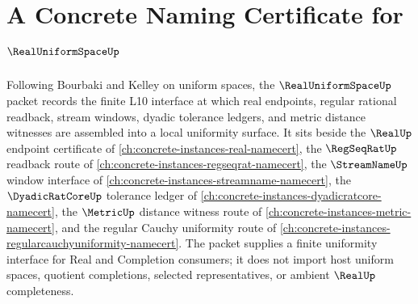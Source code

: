 \chapter{A Concrete Naming Certificate for $\RealUniformSpaceUp$}
\label{ch:concrete-instances-real-uniform-space-namecert}

Following Bourbaki and Kelley on uniform spaces, the $\RealUniformSpaceUp$ packet records the finite L10 interface at which real endpoints, regular rational readback, stream windows, dyadic tolerance ledgers, and metric distance witnesses are assembled into a local uniformity surface. It sits beside the $\RealUp$ endpoint certificate of \autoref{ch:concrete-instances-real-namecert}, the $\RegSeqRatUp$ readback route of \autoref{ch:concrete-instances-regseqrat-namecert}, the $\StreamNameUp$ window interface of \autoref{ch:concrete-instances-streamname-namecert}, the $\DyadicRatCoreUp$ tolerance ledger of \autoref{ch:concrete-instances-dyadicratcore-namecert}, the $\MetricUp$ distance witness route of \autoref{ch:concrete-instances-metric-namecert}, and the regular Cauchy uniformity route of \autoref{ch:concrete-instances-regularcauchyuniformity-namecert}. The packet supplies a finite uniformity interface for Real and Completion consumers; it does not import host uniform spaces, quotient completions, selected representatives, or ambient $\RealUp$ completeness.


